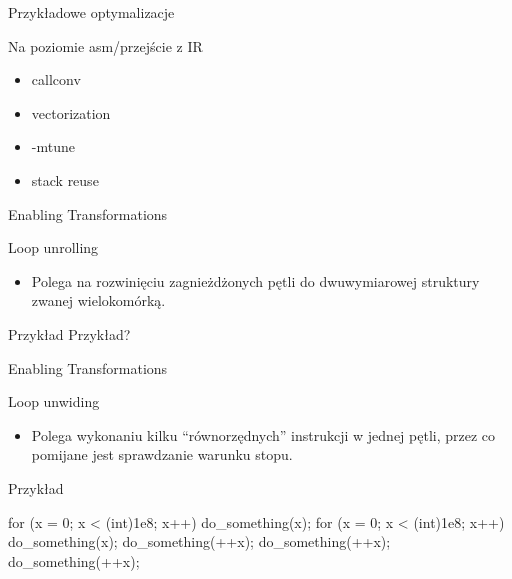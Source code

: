 \begin{frame}{Przykładowe optymalizacje}
\begin{block}{Na poziomie asm/przejście z IR}
\begin{itemize}
			\item callconv
			\item vectorization
			\item -mtune
			\item stack reuse
		\end{itemize}
	\end{block}
\end{frame}
\begin{frame}[fragile]{Enabling Transformations}
	\begin{block}{Loop unrolling}
		\begin{itemize}
		 \item Polega na rozwinięciu zagnieżdżonych pętli do dwuwymiarowej struktury zwanej
		 wielokomórką.
		\end{itemize}
	\end{block}
	\begin{block}{Przykład}
		Przykład?
	\end{block}
\end{frame}
\begin{frame}[fragile]{Enabling Transformations}
	\begin{block}{Loop unwiding} %
		\begin{itemize}
		 \item Polega wykonaniu kilku ``równorzędnych'' instrukcji w jednej pętli, przez co pomijane jest
		 sprawdzanie warunku stopu.
		\end{itemize}
	\end{block}
	\begin{block}{Przykład}
		\begin{cpp}
		for (x = 0; x < (int)1e8; x++)
		{
		    do_something(x);
		}
		for (x = 0; x < (int)1e8; x++)
		{
		    do_something(x);
		    do_something(++x);
		    do_something(++x);
		    do_something(++x);
		}
		\end{cpp}
	\end{block}
\end{frame}
